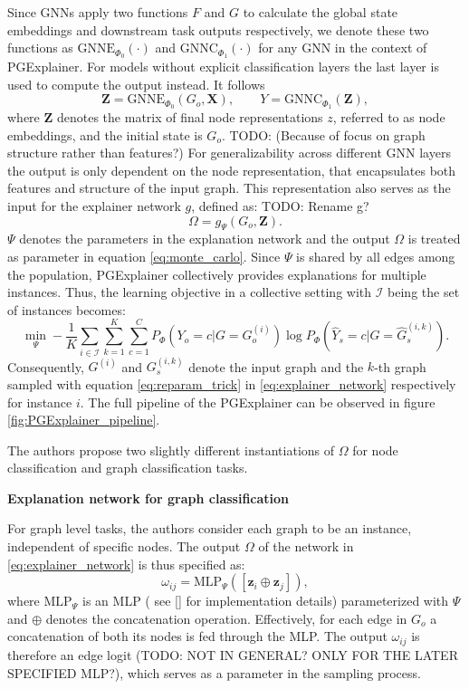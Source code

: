 Since GNNs apply two functions $F$ and $G$ to calculate the global state embeddings and downstream task outputs respectively, we denote these two functions as $\text{GNNE}_{\Phi_0}(\cdot)$ and $\text{GNNC}_{\Phi_1}(\cdot)$ for any GNN in the context of PGExplainer. For models without explicit classification layers the last layer is used to compute the output instead. It follows
\begin{equation}
    \mathbf{Z} = \text{GNNE}_{\Phi_0}(G_o, \mathbf{X}), \qquad Y = \text{GNNC}_{\Phi_1}(\mathbf{Z}),
\end{equation}
where $\mathbf{Z}$ denotes the matrix of final node representations $z$, referred to as node embeddings, and the initial state is $G_o$. TODO: (Because of focus on graph structure rather than features?) For generalizability across different GNN layers the output is only dependent on the node representation, that encapsulates both features and structure of the input graph. This representation also serves as the input for the explainer network $g$, defined as:
TODO: Rename g?
\begin{equation}
    \label{eq:explainer_network}
    \Omega = g_\Psi(G_o,\mathbf{Z}).
\end{equation}
$\Psi$ denotes the parameters in the explanation network and the output $\Omega$ is treated as parameter in equation \ref{eq:monte_carlo}. Since $\Psi$ is shared by all edges among the population, PGExplainer collectively provides explanations for multiple instances. Thus, the learning objective in a collective setting with $\mathcal{I}$ being the set of instances becomes:
\begin{equation}
    \label{eq:mlp_loss}
    \min_\Psi -\frac{1}{K}\sum_{i\in \mathcal{I}}\sum_{k=1}^K\sum_{c=1}^C P_\Phi (Y_o = c|G = G_o^{(i)}) \log P_\Phi(\hat{Y}_s = c|G=\hat{G}_s^{(i,k)}).
\end{equation}
Consequently, $G^{(i)}$ and $G_s^{(i,k)}$ denote the input graph and the $k$-th graph sampled with equation \ref{eq:reparam_trick} in \ref{eq:explainer_network} respectively for instance $i$. The full pipeline of the PGExplainer can be observed in figure \ref{fig:PGExplainer_pipeline}. 

The authors propose two slightly different instantiations of $\Omega$ for node classification and graph classification tasks.

\textbf{Explanation network for graph classification}

For graph level tasks, the authors consider each graph to be an instance, independent  of specific nodes. The output $\Omega$ of the network in \ref{eq:explainer_network} is thus specified as:
\begin{equation}
    \label{eq:mlp_graph_input}
    \omega_{ij} = \text{MLP}_\Psi ([\mathbf{z}_i\oplus\mathbf{z}_j]),
\end{equation}
where $\text{MLP}_\Psi$ is an MLP ( see \ref{} for implementation details) parameterized with $\Psi$ and $\oplus$ denotes the concatenation operation. Effectively, for each edge in $G_o$ a concatenation of both its nodes is fed through the MLP. The output $\omega_{ij}$ is therefore an edge logit (TODO: NOT IN GENERAL? ONLY FOR THE LATER SPECIFIED MLP?), which serves as a parameter in the sampling process.

